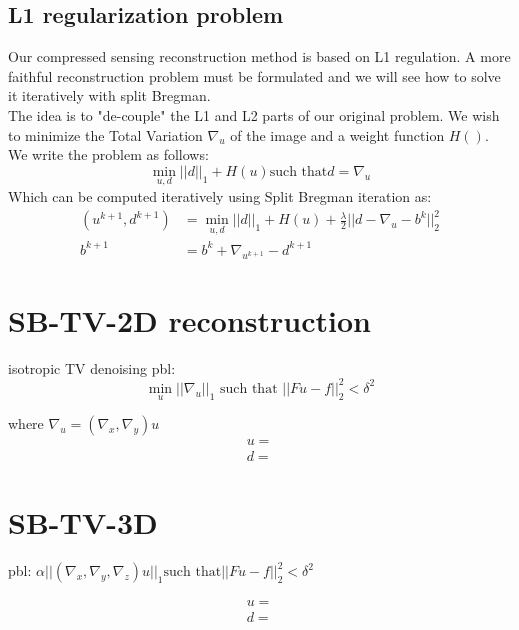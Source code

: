     \subsection{L1 regularization problem}
    Our compressed sensing reconstruction method is based on L1 regulation. A more faithful reconstruction problem must be formulated and we will see how to solve it iteratively with split Bregman.\\
    The idea is to "de-couple" the L1 and L2 parts of our original problem. We wish to minimize the Total Variation $\nabla_u$ of the image and a weight function $H()$. We write the problem as follows:
    \begin{equation}
        \label{Eq:L1Const}
        \min_{u,d}||d||_1 + H(u) \mbox{such that} d = \nabla_u
    \end{equation}
    Which can be computed iteratively using Split Bregman iteration as:
    \begin{equation}
        \begin{aligned}
            (u^{k+1},d^{k+1}) &= \min_{u,d} ||d||_1 + H(u) +     \frac{\lambda}{2}||d - \nabla_u - b^k||^2_2\\
            b^{k+1} &= b^k + \nabla_{u^{k+1}} - d^{k+1}
    \end{aligned}
    \end{equation}
\section{SB-TV-2D reconstruction}
    isotropic TV denoising pbl: 
    \begin{equation}
        \min_{u} ||\nabla_u||_1 \mbox{ such that } ||Fu - f||_2^2 < \delta^2
    \end{equation}
    
    where $\nabla_u = (\nabla_x,\nabla_y)u$
    \begin{equation}
        \begin{aligned}
            u =\\
            d =
        \end{aligned}
    \end{equation}
\section{SB-TV-3D}
    pbl: $\alpha ||(\nabla_x,\nabla_y, \nabla_z)u||_1 \mbox{such that} ||Fu - f||_2^2 < \delta^2$
    
    \begin{equation}
        \begin{aligned}
            u =\\
            d =
        \end{aligned}
    \end{equation}